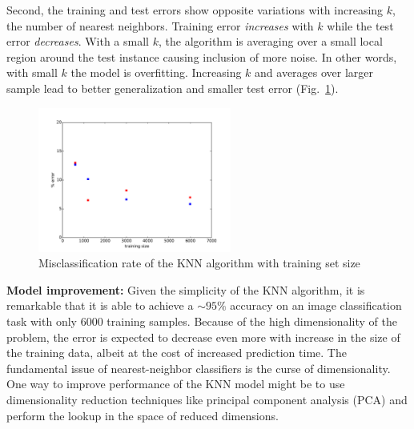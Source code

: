 \documentclass[10pt,letterpaper]{article}
\begin{document}
Second, the training and test errors show opposite variations with increasing $k$, the number of nearest neighbors. Training error {\em increases} with $k$ while the test error {\em decreases}. With a small $k$, the algorithm is averaging over a small local region around the test instance causing inclusion of more noise. In other words, with small $k$ the model is overfitting. Increasing $k$ and averages over larger sample lead to better generalization and smaller test error (Fig.~\ref{knn2}). 
%
\begin{figure}[tbp]
	\begin{center}
	\includegraphics[width=2.5in]{../results/mnist/knn/error_vs_training_size.pdf}
	\end{center}
	\caption{Misclassification rate of the KNN algorithm with training set size \label{knn2}}
\end{figure}
%

{\bf Model improvement:} Given the simplicity of the KNN algorithm, it is remarkable that it is able to achieve a $\sim95\%$ accuracy on an image classification task with only 6000 training samples. Because of the high dimensionality of the problem, the error is expected to decrease even more with increase in the size of the training data, albeit at the cost of increased prediction time. The fundamental issue of nearest-neighbor classifiers is the curse of dimensionality. One way to improve performance of the KNN model might be to use dimensionality reduction techniques like principal component analysis (PCA) and perform the lookup in the space of reduced dimensions. 
\end{document}
